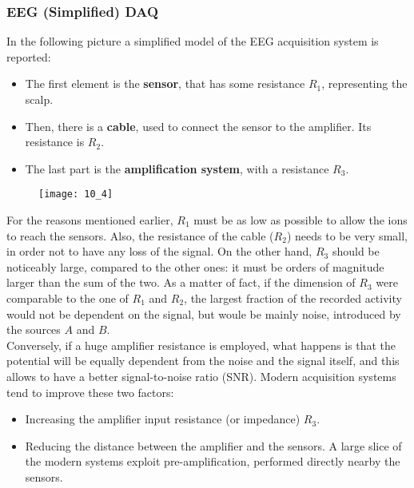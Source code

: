 \subsubsection{EEG (Simplified) DAQ}
In the following picture a simplified model of the EEG acquisition system is reported:
\begin{itemize}
    \item The first element is the \textbf{sensor}, that has some resistance
          \(R_1\), representing the scalp.
    \item Then, there is a \textbf{cable}, used to connect the sensor to the amplifier.
          Its resistance is \(R_2\).
    \item The last part is the \textbf{amplification system}, with a resistance \(R_3\).
\end{itemize}
\begin{figure}[H]
    \texttt{[image: 10\_4]}
    \centering
\end{figure}
For the reasons mentioned earlier, \(R_1\) must be as low as possible to allow the ions to
reach the sensors. Also, the resistance of the cable (\(R_2\)) needs to be very small, in
order not to have any loss of the signal. On the other hand, \(R_3\) should be noticeably
large, compared to the other ones: it must be orders of magnitude larger than the sum of
the two. As a matter of fact, if the dimension of \(R_3\) were comparable to the one of
\(R_1\) and \(R_2\), the largest fraction of the recorded activity would not be dependent on
the signal, but woule be mainly noise, introduced by the sources \(A\) and \(B\).\\
Conversely, if a huge amplifier resistance is employed, what happens is that the potential
will be equally dependent from the noise and the signal itself, and this allows to have a
better signal-to-noise ratio (SNR). Modern acquisition systems tend to improve these two
factors:
\begin{itemize}
    \item Increasing the amplifier input resistance (or impedance) \(R_3\).
    \item Reducing the distance between the amplifier and the sensors. A large slice of the
    modern systems exploit pre-amplification, performed directly nearby the sensors.
\end{itemize}

